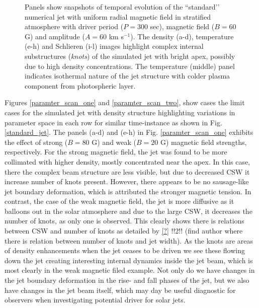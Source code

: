 \documentclass[12pt]{ociamthesis}
\newcommand{\fref}[1]{Fig. \eqref{#1}}
\newcommand{\np}{\\ \\}
\begin{document}
\begin{figure}
\captionsetup[subfigure]{labelformat=empty}
\centering
{}
\caption{Panels show snapshots of temporal evolution of the ``standard’’ numerical jet with uniform radial magnetic field in stratified atmosphere with driver period ($P = 300$ sec), magnetic field ($B = 60$ G) and amplitude ($A = 60$ km s$^{-1}$). The density (a-d), temperature (e-h) and Schlieren (i-l) images highlight complex internal substructures (\textit{knots}) of the simulated jet with bright apex, possibly due to high density concentrations. The temperature (middle) panel indicates isothermal nature of the jet structure with colder plasma component from photospheric layer. }
\label{standard_jet}
\end{figure}
%
Figures \ref{paramter_scan_one} and \ref{paramter_scan_two}, show cases the limit cases for the simulated jet with density structure highlighting variations in parameter space in each row for similar time-instance as shown in \fref{standard_jet}. The panels (a-d) and (e-h) in \fref{paramter_scan_one} exhibits the effect of strong ($B = 80$ G) and weak ($B = 20$ G) magnetic field strengths, respectively. For the strong magnetic field, the jet was found to be more collimated with higher density, mostly concentrated near the apex. In this case, there the complex beam structure are less visible, but due to decreased CSW it increase number of knots present. However, there appears to be no sausage-like jet boundary deformation, which is attributed the stronger magnetic tension. In contrast, the case of the weak magnetic field, the jet is more diffusive as it balloons out in the solar atmosphere and due to the large CSW, it decreases the number of knots, as only one is observed. This clearly shows there is relations between CSW and number of knots as detailed by \ref{?} !!2!! (find author where there is relation between number of knots and jet width). As the knots are areas of density enhancements when the jet ceases to be driven we see these flowing down the jet creating interesting internal dynamics inside the jet beam, which is most clearly in the weak magnetic filed example. Not only do we have changes in the jet boundary deformation in the rise- and fall phases of the jet, but we also have changes in the jet beam itself, which may day be useful diagnostic for observers when investigating potential driver for solar jets. \np     
%
\end{document}
